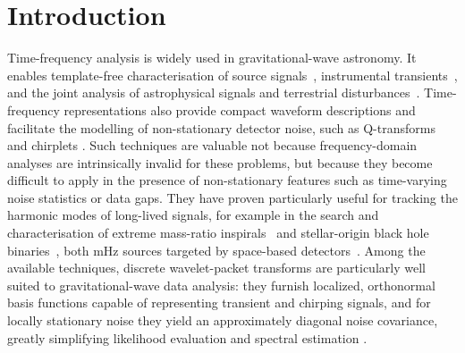 \documentclass[twocolumn,preprintnumbers,
  superscriptaddress,
  nofootinbib,
  amsmath,
  amssymb,
  aps,
  prd,
  colorlinks=true,
  linkcolor=blue,
  urlcolor=blue,
  citecolor=blue,
  anchorcolor=blue
]{revtex4-2}
\begin{document}
\maketitle



\section{Introduction}

Time-frequency analysis is widely used in gravitational-wave astronomy. It enables template-free characterisation of source signals~\cite{krolak_1996,Virtuoso2024}, instrumental transients~\cite{robinet2020}, and the joint analysis of astrophysical signals and terrestrial disturbances~\cite{Cornish_2015}. Time-frequency representations also provide compact waveform descriptions and facilitate the modelling of non-stationary detector noise, such as Q-transforms \cite{Chatterji:2004qg} and chirplets \cite{ChassandeMottin:2005bm}.
Such techniques are valuable not because frequency-domain analyses are intrinsically invalid for these problems, but because they become difficult to apply in the presence of non-stationary features such as time-varying noise statistics or data gaps. They have proven particularly useful for tracking the harmonic modes of long-lived signals, for example in the search and characterisation of extreme mass-ratio inspirals~\cite{Gair_2005, Gair:2008ec, Speri_2026} and stellar-origin black hole binaries~\cite{bandopadhyay2026globaltimefrequencysearchstellarmass}, both mHz sources targeted by space-based detectors~\cite{2024arXiv240207571C, Luo:2015uga}. Among the available techniques, discrete wavelet-packet transforms are particularly well suited to gravitational-wave data analysis: they furnish localized, orthonormal basis functions capable of representing transient and chirping signals, and for locally stationary noise they yield an approximately diagonal noise covariance, greatly simplifying likelihood evaluation and spectral estimation \cite{Cornish:2020kdz}.
\end{document}
